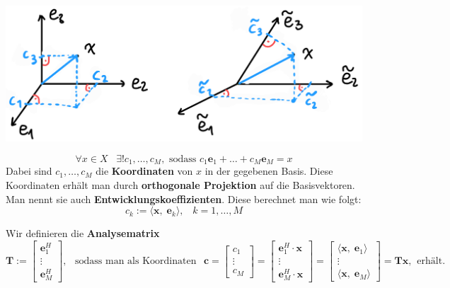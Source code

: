 \documentclass[11pt]{article}
\begin{document}
\begin{center}
    \vspace*{-0.8cm}
    \includegraphics[width=0.6\linewidth]{docimgs/Basen.jpg}
\end{center}

\vspace*{-1cm}
$$\forall x \in X \hspace{10pt} \exists ! c_1, \dots, c_M, \text{ sodass } c_1 \mathbf{e}_1 + \dots + c_M \mathbf{e}_M = x$$
Dabei sind $c_1, \dots, c_M$ die \textbf{Koordinaten} von $x$ in der gegebenen Basis. Diese Koordinaten erhält man durch \textbf{orthogonale Projektion} auf die Basisvektoren. Man nennt sie auch \textbf{Entwicklungskoeffizienten}. Diese berechnet man wie folgt:
$$c_k := \langle \mathbf{x}, \; \mathbf{e}_k \rangle, \hspace{10pt} k=1, \dots, M$$

Wir definieren die \textbf{Analysematrix}
$$\mathbf{T}:= \begin{bmatrix}
    \mathbf{e}_1^H \\
    \vdots \\
    \mathbf{e}_M^H
\end{bmatrix},\hspace{5pt} \text{ sodass man als Koordinaten }\hspace{5pt}  \mathbf{c} = \begin{bmatrix}
    c_1 \\
    \vdots \\
    c_M
\end{bmatrix} = \begin{bmatrix}
    \mathbf{e}_1^H \cdot \mathbf{x}\\
    \vdots \\
    \mathbf{e}_M^H \cdot \mathbf{x}
\end{bmatrix} = \begin{bmatrix}
    \langle \mathbf{x}, \; \mathbf{e}_1 \rangle \\
    \vdots \\
    \langle \mathbf{x}, \; \mathbf{e}_M \rangle 
\end{bmatrix} = \mathbf{Tx}, \hspace{5pt} \text{erhält.}$$
\end{document}

